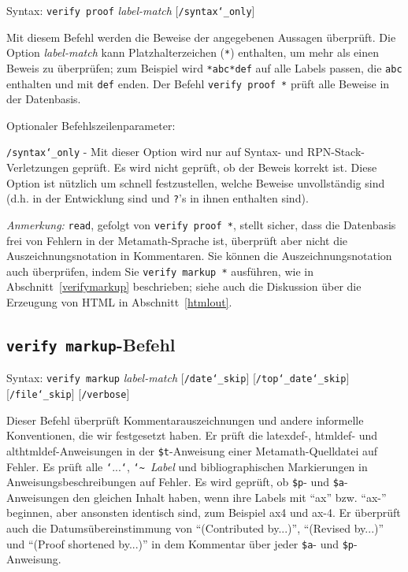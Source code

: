 Syntax:  \texttt{verify proof} {\em label-match} [\texttt{/syntax{\char`\_}only}]

Mit diesem Befehl werden die Beweise der angegebenen Aussagen überprüft.  Die Option {\em label-match} kann Platzhalterzeichen (\texttt{*}) enthalten, um mehr als einen Beweis zu überprüfen; zum Beispiel wird \verb/*abc*def/ auf alle Labels passen, die \texttt{abc} enthalten und mit \texttt{def} enden. Der Befehl \texttt{verify proof *} prüft alle Beweise in der Datenbasis. 

Optionaler Befehlszeilenparameter:

    \texttt{/syntax{\char`\_}only} - Mit dieser Option wird nur auf Syntax- und RPN-Stack-Verletzungen geprüft.  Es wird nicht geprüft, ob der Beweis korrekt ist.  Diese Option ist nützlich um schnell festzustellen, welche Beweise unvollständig sind (d.h. in der Entwicklung sind und \texttt{?}'s in ihnen enthalten sind).

{\em Anmerkung:} \texttt{read}, gefolgt von \texttt{verify proof *}, stellt sicher, dass die Datenbasis frei von Fehlern in der Metamath-Sprache ist, überprüft aber nicht die Auszeichnungsnotation in Kommentaren. Sie können die Auszeichnungsnotation auch überprüfen, indem Sie \texttt{verify markup *} ausführen, wie in Abschnitt~\ref{verifymarkup} beschrieben; siehe auch die Diskussion über die Erzeugung von {\sc HTML} in Abschnitt~\ref{htmlout}. 


\subsection{\texttt{verify markup}-Befehl}\label{verifymarkup}

Syntax:  \texttt{verify markup} {\em label-match}
[\texttt{/date{\char`\_}skip}]
[\texttt{/top{\char`\_}date{\char`\_}skip}] {\\}
[\texttt{/file{\char`\_}skip}]
[\texttt{/verbose}]

Dieser Befehl überprüft Kommentarauszeichnungen und andere informelle Konventionen, die wir festgesetzt haben.  Er prüft die latexdef-, htmldef- und althtmldef-Anweisungen in der \texttt{\$t}-Anweisung einer Metamath-Quelldatei auf Fehler. Es prüft alle \texttt{`}...\texttt{`}, \texttt{\char`\~}~\textit{Label} und bibliographischen Markierungen in Anweisungsbeschreibungen auf Fehler. Es wird geprüft, ob \texttt{\$p}- und \texttt{\$a}-Anweisungen den gleichen Inhalt haben, wenn ihre Labels mit "`ax"' bzw. "`ax-"' beginnen, aber ansonsten identisch sind, zum Beispiel ax4 und ax-4. Er überprüft auch die Datumsübereinstimmung von "`(Contributed by...)"', "`(Revised by...)"' und "`(Proof shortened by...)"' in dem Kommentar über jeder \texttt{\$a}- und \texttt{\$p}-Anweisung. 

